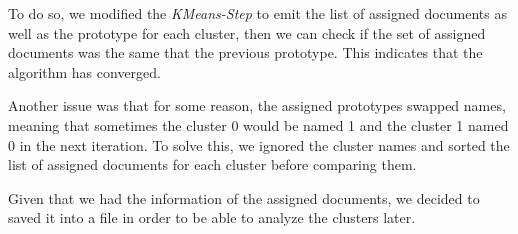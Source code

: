 To do so, we modified the \emph{KMeans-Step} to emit the list of assigned documents
as well as the prototype for each cluster, then we can check if the set of
assigned documents was the same that the previous prototype. This indicates that the
algorithm has converged.

Another issue was that for some reason, the assigned prototypes swapped names, meaning
that sometimes the cluster 0 would be named 1 and the cluster 1 named 0 in the next iteration.
To solve this, we ignored the cluster names and sorted the list of assigned documents for each
cluster before comparing them.

Given that we had the information of the assigned documents, we decided to saved it into a file
in order to be able to analyze the clusters later.
